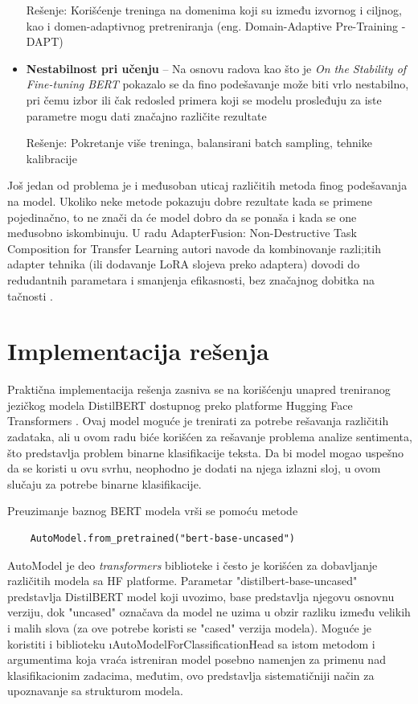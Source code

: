 \documentclass[12pt,oneside]{memoir}
\begin{document}
\begin{itemize}
	Rešenje: Korišćenje treninga na domenima koji su između izvornog i ciljnog, kao i domen-adaptivnog pretreniranja (eng. Domain-Adaptive Pre-Training - DAPT) \cite{ding2023diagnosing}
	
	\item \textbf{Nestabilnost pri učenju} – Na osnovu radova kao što je \textit{On the Stability of Fine-tuning BERT} pokazalo se da fino podešavanje može biti vrlo nestabilno, pri čemu izbor ili čak redosled primera koji se modelu prosleđuju za iste parametre mogu dati značajno različite rezultate
	
	Rešenje: Pokretanje više treninga, balansirani batch sampling, tehnike kalibracije \cite{2025calibration}
	
\end{itemize}


Još jedan od problema je i međusoban uticaj različitih metoda finog podešavanja na model. Ukoliko neke metode pokazuju dobre rezultate kada se primene pojedinačno, to ne znači da će model dobro da se ponaša i kada se one međusobno iskombinuju. U radu AdapterFusion: Non-Destructive Task Composition for Transfer Learning autori navode da kombinovanje razli;itih adapter tehnika (ili dodavanje LoRA slojeva preko adaptera) dovodi do redudantnih parametara i smanjenja efikasnosti, bez značajnog dobitka na tačnosti \cite{pfeiffer2021adapternondestructive}.


\chapter{Implementacija rešenja}
Praktična implementacija rešenja zasniva se na korišćenju unapred treniranog jezičkog modela DistilBERT dostupnog preko platforme Hugging Face Transformers \cite{Huggingface2023}. Ovaj model moguće je trenirati za potrebe rešavanja različitih zadataka, ali u ovom radu biće korišćen za rešavanje problema analize sentimenta, što predstavlja problem binarne klasifikacije teksta. Da bi model mogao uspešno da se koristi u ovu svrhu, neophodno je dodati na njega izlazni sloj, u ovom slučaju za potrebe binarne klasifikacije.

Preuzimanje baznog BERT modela vrši se pomoću metode \begin{verbatim}
	AutoModel.from_pretrained("bert-base-uncased")
\end{verbatim}
AutoModel je deo \textit{transformers} biblioteke i često je korišćen za dobavljanje različitih modela sa HF platforme. Parametar "distilbert-base-uncased" predstavlja DistilBERT model koji uvozimo, base predstavlja njegovu osnovnu verziju, dok "uncased" označava da model ne uzima u obzir razliku između velikih i malih slova (za ove potrebe koristi se "cased" verzija modela). Moguće je koristiti i biblioteku \i{AutoModelForClassificationHead} sa istom metodom i argumentima koja vraća istreniran model posebno namenjen za primenu nad klasifikacionim zadacima, međutim, ovo predstavlja sistematičniji način za upoznavanje sa strukturom modela.
\end{document}
